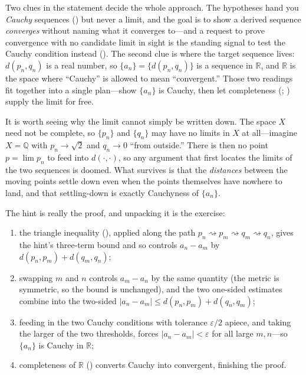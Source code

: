\documentclass[main.tex]{subfiles}
\begin{document}
\begin{Reflection}
Two clues in the statement decide the whole approach. The hypotheses hand you \emph{Cauchy} sequences
() but never a limit, and the goal is to show a derived sequence \emph{converges} without
naming what it converges to---and a request to prove convergence with no candidate limit in sight is
the standing signal to test the Cauchy condition instead (). The second clue is where the
target sequence lives: $d(p_{n},q_{n})$ is a real number, so $\{a_{n}\}=\{d(p_{n},q_{n})\}$ is a
sequence in $\mathbb R$, and $\mathbb R$ is the space where ``Cauchy'' is allowed to mean
``convergent.'' Those two readings fit together into a single plan---show $\{a_{n}\}$ is Cauchy, then
let completeness (; ) supply the limit for free.

It is worth seeing why the limit cannot simply be written down. The space $X$ need not be complete, so
$\{p_{n}\}$ and $\{q_{n}\}$ may have no limits in $X$ at all---imagine $X=\mathbb Q$ with
$p_{n}\to\sqrt2$ and $q_{n}\to 0$ ``from outside.'' There is then no point $p=\lim p_{n}$ to feed into
$d(\cdot,\cdot)$, so any argument that first locates the limits of the two sequences is doomed. What
survives is that the \emph{distances} between the moving points settle down even when the points
themselves have nowhere to land, and that settling-down is exactly Cauchyness of $\{a_{n}\}$.

The hint is really the proof, and unpacking it is the exercise:
\begin{enumerate}[leftmargin=1.7em,itemsep=3pt,topsep=2pt,label=\textnormal{(\arabic*)}]
  \item the triangle inequality (), applied along the path
        $p_{n}\rightsquigarrow p_{m}\rightsquigarrow q_{m}\rightsquigarrow q_{n}$, gives the hint's
        three-term bound and so controls $a_{n}-a_{m}$ by $d(p_{n},p_{m})+d(q_{m},q_{n})$;
  \item swapping $m$ and $n$ controls $a_{m}-a_{n}$ by the same quantity (the metric is symmetric, so
        the bound is unchanged), and the two one-sided estimates combine into the two-sided
        $|a_{n}-a_{m}|\le d(p_{n},p_{m})+d(q_{n},q_{m})$;
  \item feeding in the two Cauchy conditions with tolerance $\varepsilon/2$ apiece, and taking the
        larger of the two thresholds, forces $|a_{n}-a_{m}|<\varepsilon$ for all large $m,n$---so
        $\{a_{n}\}$ is Cauchy in $\mathbb R$;
  \item completeness of $\mathbb R$ () converts Cauchy into convergent, finishing the
        proof.
\end{enumerate}


\end{Reflection}
\end{document}
